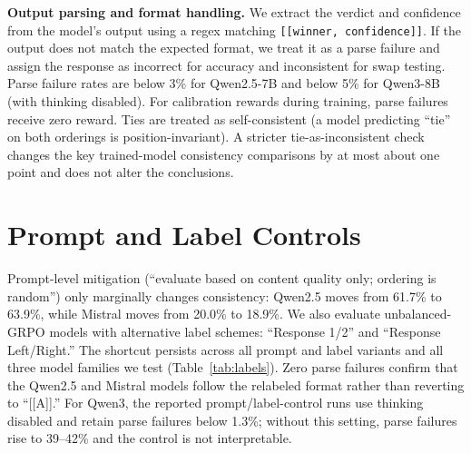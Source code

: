 \documentclass[letterpaper]{article}
\begin{document}
\textbf{Output parsing and format handling.} We extract the verdict and confidence from the model's output using a regex matching \texttt{[[winner, confidence]]}. If the output does not match the expected format, we treat it as a parse failure and assign the response as incorrect for accuracy and inconsistent for swap testing. Parse failure rates are below 3\% for Qwen2.5-7B and below 5\% for Qwen3-8B (with thinking disabled). For calibration rewards during training, parse failures receive zero reward. Ties are treated as self-consistent (a model predicting ``tie'' on both orderings is position-invariant). A stricter tie-as-inconsistent check changes the key trained-model consistency comparisons by at most about one point and does not alter the conclusions.

\section{Prompt and Label Controls}
\label{app:label_controls}

Prompt-level mitigation (``evaluate based on content quality only; ordering is random'') only marginally changes consistency: Qwen2.5 moves from 61.7\% to 63.9\%, while Mistral moves from 20.0\% to 18.9\%. We also evaluate unbalanced-GRPO models with alternative label schemes: ``Response 1/2'' and ``Response Left/Right.'' The shortcut persists across all prompt and label variants and all three model families we test (Table~\ref{tab:labels}). Zero parse failures confirm that the Qwen2.5 and Mistral models follow the relabeled format rather than reverting to ``[[A]].'' For Qwen3, the reported prompt/label-control runs use thinking disabled and retain parse failures below 1.3\%; without this setting, parse failures rise to 39--42\% and the control is not interpretable.
\end{document}
